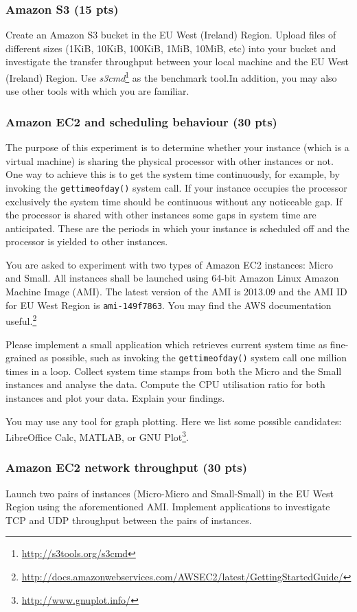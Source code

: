 \documentclass[12pt, a4paper]{article}
\begin{document}
\subsubsection{Amazon S3 (15 pts)}
Create an Amazon S3 bucket in the EU West (Ireland) Region.
Upload files of different sizes (1KiB, 10KiB, 100KiB, 1MiB, 10MiB, etc) into your bucket and investigate the transfer throughput between your local machine and the EU West (Ireland) Region.
Use \emph{s3cmd}\footnote{\url{http://s3tools.org/s3cmd}} as the benchmark tool.In addition, you may also use other tools with which you are familiar.

\subsubsection{Amazon EC2 and scheduling behaviour (30 pts)}
The purpose of this experiment is to determine whether your instance (which is a virtual machine) is sharing the physical processor with other instances or not.
One way to achieve this is to get the system time continuously, for example, by invoking the \texttt{gettimeofday()} system call.
If your instance occupies the processor exclusively the system time should be continuous without any noticeable gap.
If the processor is shared with other instances some gaps in system time are anticipated.
These are the periods in which your instance is scheduled off and the processor is yielded to other instances.

You are asked to experiment with two types of Amazon EC2 instances: Micro and Small.
All instances shall be launched using 64-bit Amazon Linux Amazon Machine Image (AMI).
The latest version of the AMI is 2013.09 and the AMI ID for EU West Region is \texttt{ami-149f7863}.
You may find the AWS documentation useful.\footnote{\url{http://docs.amazonwebservices.com/AWSEC2/latest/GettingStartedGuide/}}

Please implement a small application which retrieves current system time as fine-grained as possible, such as invoking the \texttt{gettimeofday()} system call one million times in a loop.
Collect system time stamps from both the Micro and the Small instances and analyse the data.
Compute the CPU utilisation ratio for both instances and plot your data.
Explain your findings.

You may use any tool for graph plotting.
Here we list some possible candidates: LibreOffice Calc, MATLAB, or GNU Plot\footnote{\url{http://www.gnuplot.info/}}.

\subsubsection{Amazon EC2 network throughput (30 pts)}
Launch two pairs of instances (Micro-Micro and Small-Small) in the EU West Region using the aforementioned AMI.
Implement applications to investigate TCP and UDP throughput between the pairs of instances.
\end{document}
